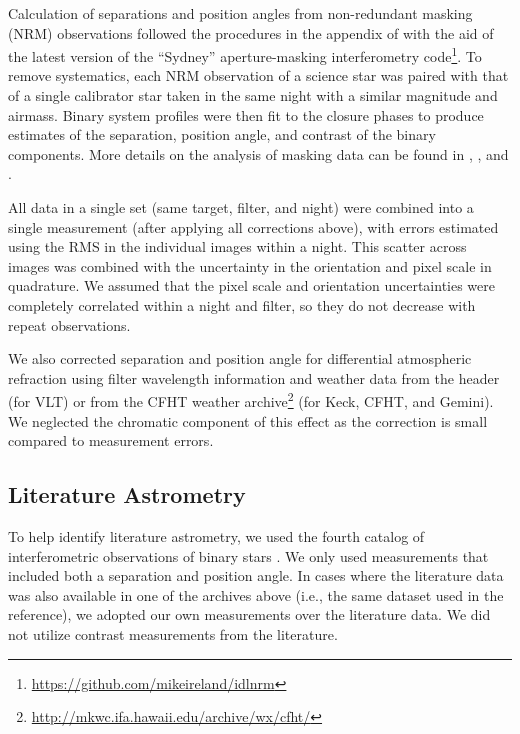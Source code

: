 \documentclass[twocolumn]{aastex62}
\begin{document}
Calculation of separations and position angles from non-redundant masking (NRM) observations followed the procedures in the appendix of \citet{Kraus2008} with the aid of the latest version of the ``Sydney'' aperture-masking interferometry code\footnote{\href{https://github.com/mikeireland/idlnrm}{https://github.com/mikeireland/idlnrm}}. To remove systematics, each NRM observation of a science star was paired with that of a single calibrator star taken in the same night with a similar magnitude and airmass. Binary system profiles were then fit to the closure phases to produce estimates of the separation, position angle, and contrast of the binary components. More details on the analysis of masking data can be found in \citet{2006ApJ...650L.131L}, \citet{Kraus2008}, and \citet{2012ApJ...744..120E}.

All data in a single set (same target, filter, and night) were combined into a single measurement (after applying all corrections above), with errors estimated using the RMS in the individual images within a night. This scatter across images was combined with the uncertainty in the orientation and pixel scale in quadrature. We assumed that the pixel scale and orientation uncertainties were completely correlated within a night and filter, so they do not decrease with repeat observations. 

We also corrected separation and position angle for differential atmospheric refraction \citep[DAR, ][]{2010SPIE.7736E..1IL} using filter wavelength information and weather data from the header (for VLT) or from the CFHT weather archive\footnote{\href{http://mkwc.ifa.hawaii.edu/archive/wx/cfht/}{http://mkwc.ifa.hawaii.edu/archive/wx/cfht/}} (for Keck, CFHT, and Gemini). We neglected the chromatic component of this effect as the correction is small compared to measurement errors. 


\subsection{Literature Astrometry}\label{sec:litas}

To help identify literature astrometry, we used the fourth catalog of interferometric observations of binary stars \citep[INT4,][]{Hartkopf:2001}. We only used measurements that included both a separation and position angle. In cases where the literature data was also available in one of the archives above (i.e., the same dataset used in the reference), we adopted our own measurements over the literature data. We did not utilize contrast measurements from the literature.
\end{document}
